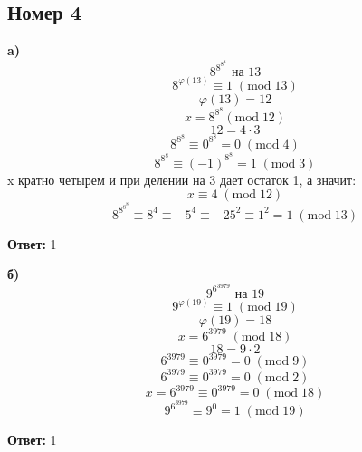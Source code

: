 \documentclass[a4paper,12pt]{article}
\begin{document}
\subsection*{Номер 4}
\textbf{a)}
\[
8^{8^{8^{8}}} \text{ на } 13
\]
\[
8^{\varphi(13)} \equiv 1 \; (\text{mod} \; 13)
\]
\[
\varphi(13) = 12
\]
\[
x = 8^{8^8}  (\text{mod} \; 12)
\]
\[
12 = 4 \cdot 3
\]
\[
8^{8^8} \equiv 0^{8^8} = 0 \; (\text{mod} \; 4)
\]
\[
8^{8^8} \equiv (-1)^{8^8} = 1   \; (\text{mod} \; 3)
\]
x кратно четырем и при делении на 3 дает остаток 1, а значит:
\[
x \equiv 4  \; (\text{mod} \; 12)
\]
\[
8^{8^{8^{8}}} \equiv 8^{4}  \equiv -5^4 \equiv -25^{2} \equiv 1^2 = 1   \; (\text{mod} \; 13)
\]
\begin{center}
\textbf{Ответ:} 1
\end{center}
\textbf{б)}
\[
9^{6^{3979}} \text{ на } 19
\]
\[
9^{\varphi(19)} \equiv 1  \; (\text{mod} \; 19)
\]
\[
\varphi(19) = 18
\]
\[
x = 6^{3979}  \; (\text{mod} \; 18)
\]
\[
18 = 9 \cdot 2
\]
\[
6^{3979} \equiv 0^{3979} = 0 \; (\text{mod} \; 9)
\]
\[
6^{3979} \equiv 0^{3979}   = 0 \;(\text{mod} \; 2)
\]
\[
x = 6^{3979} \equiv 0^{3979} = 0 \; (\text{mod} \; 18)
\]
\[
9^{6^{3979}} \equiv 9^{0}  = 1  \; (\text{mod} \; 19)
\]
\begin{center}
\textbf{Ответ:} 1
\end{center}
\end{document}
